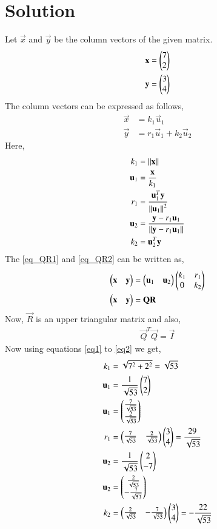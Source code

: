 \documentclass[journal,12pt,twocolumn]{IEEEtran}
\begin{document}
\section{\textbf{Solution}}
Let $\vec{x}$ and $\vec{y}$ be the column vectors of the given matrix.
\begin{align}
    \mathbf{x} &= \begin{pmatrix}7 \\ 2\end{pmatrix} \\
    \mathbf{y} &= \begin{pmatrix}3 \\ 4\end{pmatrix}
\end{align}
The column vectors can be expressed as follows,
\begin{align}
    \vec{x} &= k_1\vec{u}_1\label{eq_QR1}\\
    \vec{y} &= r_1\vec{u}_1+k_2\vec{u}_2\label{eq_QR2}
\end{align}
Here, 
\begin{align}
    k_1 &= \left\lVert\mathbf{x}\right\rVert\label{eq1}\\
    \mathbf{u}_1 &= \frac{\mathbf{x}}{k_1}\\
    r_1 &= \frac{\mathbf{u}_1^T\mathbf{y}}{\left\lVert\mathbf{u}_1\right\rVert^2}\\
    \mathbf{u}_2 &= \frac{\mathbf{y} - r_1 \mathbf{u}_1}{\left\lVert\mathbf{y} - r_1 \mathbf{u}_1\right\rVert}\\
    k_2 &= {\mathbf{u}_2^T\mathbf{y}}\label{eq2}
\end{align}
The \eqref{eq_QR1} and \eqref{eq_QR2} can be written as, 
\begin{align}
\begin{pmatrix}\mathbf{x} & \mathbf{y}\end{pmatrix} &= \begin{pmatrix}\mathbf{u}_1 & \mathbf{u}_2\end{pmatrix}\begin{pmatrix}k_1 & r_1 \\ 0 & k_2\end{pmatrix}\\
\begin{pmatrix}\mathbf{x} & \mathbf{y}\end{pmatrix} &= \mathbf{Q}\mathbf{R}\label{QRMain}
\end{align}
Now, $\vec{R}$ is an upper triangular matrix and also,
\begin{align}
\vec{Q}^T\vec{Q}=\vec{I}
\end{align}
Now using equations \eqref{eq1} to \eqref{eq2} we get, 
\begin{align}
    k_1 &= \sqrt{7^2+2^2} = \sqrt{53}\label{eqval1}\\ 
    \mathbf{u}_1 &= \frac{1}{\sqrt{53}}\begin{pmatrix}7\\2\end{pmatrix}\\
    \mathbf{u}_1 &= \begin{pmatrix}\frac{7}{\sqrt{53}} \\ \frac{2}{\sqrt{53}}\end{pmatrix} \\
    r_1 &= \begin{pmatrix}\frac{7}{\sqrt{53}}&\frac{2}{\sqrt{53}}\end{pmatrix}\begin{pmatrix}3\\4\end{pmatrix} = \frac{29}{\sqrt{53}}\\ 
    \mathbf{u}_2 &= \frac{1}{\sqrt{53}}\begin{pmatrix}2\\-7\end{pmatrix}\\
    \mathbf{u}_2 &= \begin{pmatrix}\frac{2}{\sqrt{53}} \\ -\frac{7}{\sqrt{53}}\end{pmatrix} \\
    k_2 &= \begin{pmatrix}\frac{2}{\sqrt{53}}&-\frac{7}{\sqrt{53}}\end{pmatrix}\begin{pmatrix}3\\4\end{pmatrix} = -\frac{22}{\sqrt{53}}\label{eqval2} 
\end{align}
\end{document}
